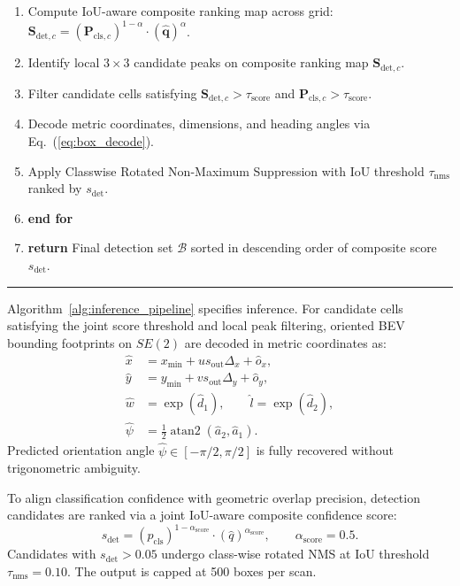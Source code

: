{\begin{enumerate}
    \item \quad Compute IoU-aware composite ranking map across grid: $\mathbf{S}_{\mathrm{det}, c} = (\mathbf{P}_{\mathrm{cls}, c})^{1 - \alpha} \cdot (\widehat{\mathbf{q}})^\alpha$.
    \item \quad Identify local $3 \times 3$ candidate peaks on composite ranking map $\mathbf{S}_{\mathrm{det}, c}$.
    \item \quad Filter candidate cells satisfying $\mathbf{S}_{\mathrm{det}, c} > \tau_{\mathrm{score}}$ and $\mathbf{P}_{\mathrm{cls}, c} > \tau_{\mathrm{score}}$.
    \item \quad Decode metric coordinates, dimensions, and heading angles via Eq.~(\ref{eq:box_decode}).
    \item \quad Apply Classwise Rotated Non-Maximum Suppression with IoU threshold $\tau_{\mathrm{nms}}$ ranked by $s_{\mathrm{det}}$.
    \item \textbf{end for}
    \item \textbf{return} Final detection set $\mathcal{B}$ sorted in descending order of composite score $s_{\mathrm{det}}$.
\end{enumerate}
\par\vspace{2pt}\noindent\rule{\linewidth}{0.6pt}\par
}

\par\vspace{0.5\baselineskip}


Algorithm~\ref{alg:inference_pipeline} specifies inference. For candidate cells satisfying the joint score threshold and local peak filtering, oriented BEV bounding footprints on $SE(2)$ are decoded in metric coordinates as:
\begin{align}
    \hat{x} &= x_{\min} + u s_{\mathrm{out}}\Delta_x + \hat{o}_x, \nonumber\\
    \hat{y} &= y_{\min} + v s_{\mathrm{out}}\Delta_y + \hat{o}_y, \nonumber\\
    \hat{w} &= \exp(\hat{d}_1), \qquad \hat{l} = \exp(\hat{d}_2), \nonumber\\
    \hat{\psi} &= \frac{1}{2}\operatorname{atan2}(\hat{a}_2, \hat{a}_1).
    \label{eq:box_decode}
\end{align}
Predicted orientation angle $\hat{\psi} \in [-\pi/2, \pi/2]$ is fully recovered without trigonometric ambiguity.

To align classification confidence with geometric overlap precision, detection candidates are ranked via a joint IoU-aware composite confidence score:
\begin{equation}
    s_{\mathrm{det}} = (p_{\mathrm{cls}})^{1 - \alpha_{\mathrm{score}}} \cdot (\hat{q})^{\alpha_{\mathrm{score}}}, \qquad \alpha_{\mathrm{score}} = 0.5.
    \label{eq:joint_score}
\end{equation}
Candidates with $s_{\mathrm{det}} > 0.05$ undergo class-wise rotated NMS at IoU threshold $\tau_{\mathrm{nms}} = 0.10$. The output is capped at 500 boxes per scan.

